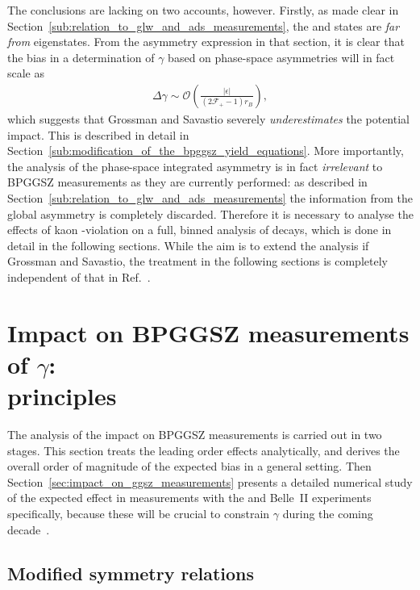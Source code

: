 The conclusions are lacking on two accounts, however. Firstly, as made clear in Section~\ref{sub:relation_to_glw_and_ads_measurements}, the \Kspipi and \KsKK states are \emph{far from} \CP eigenstates. From the asymmetry expression in that section, it is clear that the bias in a determination of $\gamma$ based on phase-space asymmetries will in fact scale as 
\begin{align}
  \Delta \gamma \sim \mathcal O \left(
  \frac{|\epsilon|}
  {(2\mathcal F_+ -1)r_B}
  \right),
\end{align} which suggests that Grossman and Savastio severely \emph{underestimates} the potential impact. This is described in detail in Section~\ref{sub:modification_of_the_bpggsz_yield_equations}. More importantly, the analysis of the phase-space integrated asymmetry is in fact \emph{irrelevant} to BPGGSZ measurements as they are currently performed: as described in Section~\ref{sub:relation_to_glw_and_ads_measurements} the information from the global asymmetry is completely discarded. Therefore it is necessary to analyse the effects of kaon \CP-violation on a full, binned analysis of \DtoKshh decays, which is done in detail in the following sections. While the aim is to extend the analysis if Grossman and Savastio, the treatment in the following sections is completely independent of that in Ref.~\cite{grossmanEffectsBarMixing2014}.

\section{\texorpdfstring{Impact on BPGGSZ measurements of $\gamma$: \\principles}{Impact on BPGGSZ measurements of gamma: principles}}%
\label{sec:impact_on_}

The analysis of the impact on BPGGSZ measurements is carried out in two stages. This section treats the leading order effects analytically, and derives the overall order of magnitude of the expected bias in a general setting. Then Section~\ref{sec:impact_on_ggsz_measurements} presents a detailed numerical study of the expected effect in measurements with the \lhcb and Belle~II experiments specifically, because these will be crucial to constrain $\gamma$ during the coming decade~\cite{kouBelleIIPhysics2019a,lhcbcollaborationPhysicsCaseLHCb2019a}. 

\subsection{Modified symmetry relations} %
\label{sub:modified_symmetry_relations}

